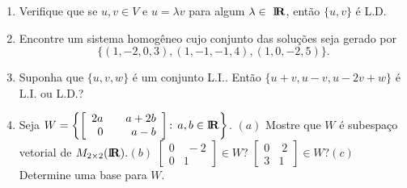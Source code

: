 \documentclass{report}
\begin{document}
\begin{Exercise}
\begin{enumerate}

\item \label{13lista3} Verifique que se $u,v\in V$ e $u=\lambda v$
para algum $\lambda \in
\Bbb{\ }%
\mbox{${\rm I}\!\mbox{\boldmath $ {\rm R}$}$}%
$, ent\~{a}o $\{u,v\}$ \'{e} L.D.


\item \label{14lista3} Encontre um sistema homog\^{e}neo cujo
conjunto das solu\c{c}\~{o}es seja gerado por
\[
\{(1,-2,0,3),(1,-1,-1,4),(1,0,-2,5)\}.
\]


\item \label{15lista3} Suponha que $\{u,v,w\}$ \'{e} um conjunto L.I.. Ent\~{a}o $%
\{u+v,u-v,u-2v+w\}$ \'{e} L.I. ou L.D.?


\item \label{16lista3}  Seja $W=\left\{ \left[
\begin{array}{rr}
2a & \quad a+2b \\
0 & a-b
\end{array}
\right] \text{: }a,b\in
\mbox{${\rm I}\!\mbox{\boldmath $ {\rm R}$}$}%
\right\} $.\newline
$(a)$ Mostre que $W$ \'{e} subespa\c{c}o vetorial de $M_{2\times 2}(%
\mbox{${\rm I}\!\mbox{\boldmath $ {\rm R}$}$}%
).$\newline $(b)$ $\left[
\begin{array}{rr}
0 & \;-2 \\
0 & 1
\end{array}
\right] \in W$? $\left[
\begin{array}{rr}
0 & \;2 \\
3 & 1
\end{array}
\right] \in W$?\newline $(c)$ Determine uma base para $W$.


\end{enumerate}
\end{Exercise}
\end{document}
